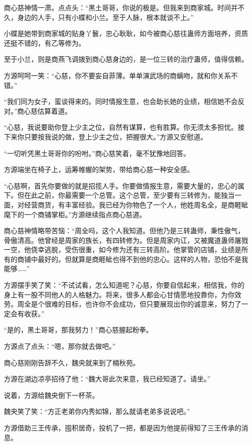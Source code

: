 \begin{this_body}
商心慈神情一肃。点点头：“黑土哥哥，你说的极是。但我来到商家城。时间并不久，身边的人手，只有小蝶和小兰。至于人脉，根本就谈不上。”

小蝶是她带到商家城的贴身丫鬟，忠心耿耿，如今被商心慈往蛊师方面培养，资质还挺不错的，有乙等修为。

至于小兰，则是商燕飞调拨到商心慈身边的，是一位三转的治疗蛊师，值得信赖。

方源呵呵一笑：“心慈，你不要妄自菲薄。单单演武场的商螭吻，就和你关系不错。”

“我们同为女子，蛮谈得来的。同时情报生意，也会助长她的业绩，相信她不会反对。”商心慈估算着道。

“心慈，我说要助你登上少主之位，自然有谋算，也有胜算。你无须太多担忧。接下来你只要按我说的做，登上少主之位，把握很大。”方源又安慰道。

“一切听凭黑土哥哥你的吩咐。”商心慈笑着，毫不犹豫地回答。

方源端坐在椅子上，运筹帷幄的架势，带给商心慈一种安全感。

“心慈啊，首先你要做的就是招揽人手。你要做情报生意，需要大量的，忠心的属下。但在此之前，你最需要一个总管。这个总管，至少要有三转修为，能独当一面，对经营商货，有丰富经验。我已经为你物色了一个人，他姓周名全，是商睚眦麾下的一个商铺掌柜。”方源继续指点商心慈道。

商心慈神情略带苦恼：“周全吗，这个人我知道。但他乃是三转蛊师，秉性傲气，骨傲清高。他曾经是周家的族长，有四转修为。但是周家内讧，又被魔道蛊师屠戮一空，他侥幸逃脱，受伤很重，如今修为还有三转高阶。他掌管的店铺，业绩是所有的商铺中最好的。但就算是商睚眦也得不到他的忠心。这样的人物，恐怕不是我能够……”

方源摆手笑了笑：“不试试看，怎么知道呢？心慈，你要自信起来，相信我，你的身上有一股不同他人的人格魅力。将来，很多人都会心甘情愿地投靠你，为你效劳。周全是个很难的目标，也许你不会成功，但只要展现出你的诚意来，努力了一定会有收获。”

“是的，黑土哥哥，那我努力！”商心慈握起粉拳。

方源点了点头：“嗯，那你就去做吧。”

商心慈刚刚告辞不久，魏央就来到了楠秋苑。

方源在湖边凉亭招待了他：“魏大哥此次来意，我已经知道了。请坐。”

说着，方源给魏央倒下一杯茶。

魏央笑了笑：“方正老弟你内秀如锦，那么就请老弟多说说吧。”

方源借助三王传承，囤积居奇，投机了一把，都是因为他提前得知了三王传承的消息。


\end{this_body}
